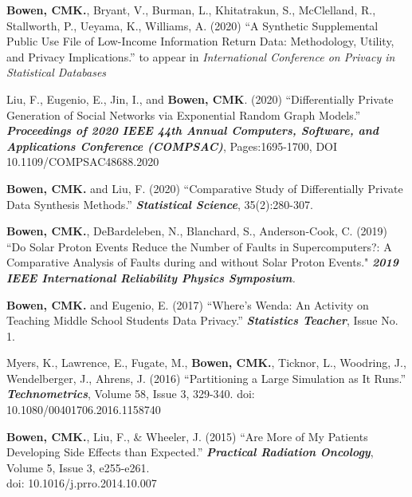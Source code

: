 \documentclass[11pt, letterpaper, roman]{moderncv} %
\begin{document}
\begin{etaremune}[topsep=0pt, itemsep=3pt, partopsep=0pt, parsep=0pt]
    \item \textbf{Bowen, CMK.}, Bryant, V., Burman, L., Khitatrakun, S., McClelland, R., Stallworth, P., Ueyama, K., Williams, A. (2020) ``A Synthetic Supplemental Public Use File of Low-Income Information Return Data: Methodology, Utility, and Privacy Implications.'' to appear in  \textit{International Conference on Privacy in Statistical Databases}
    
    \item Liu, F., Eugenio, E., Jin, I., and \textbf{Bowen, CMK}. (2020) ``Differentially Private Generation of Social Networks via Exponential Random Graph Models.'' \textit{\textbf{Proceedings of 2020 IEEE 44th Annual Computers, Software, and Applications Conference (COMPSAC)}}, Pages:1695-1700, DOI 10.1109/COMPSAC48688.2020

    \item \textbf{Bowen, CMK.} and Liu, F. (2020) ``Comparative Study of Differentially Private Data Synthesis Methods.'' \textbf{\textit{Statistical Science}}, 35(2):280-307.

    \item \textbf{Bowen, CMK.}, DeBardeleben, N., Blanchard, S., Anderson-Cook, C. (2019) ``Do Solar Proton Events Reduce the Number of Faults in Supercomputers?: A Comparative Analysis of Faults during and without Solar Proton Events." \textit{\textbf{2019 IEEE International Reliability Physics Symposium}.}

    \item \textbf{Bowen, CMK.} and Eugenio, E. (2017) ``Where's Wenda:  An Activity on Teaching Middle School Students Data Privacy.'' \textit{\textbf{Statistics Teacher}}, Issue No. 1.
    
    \item Myers, K., Lawrence, E., Fugate, M., \textbf{Bowen, CMK.}, Ticknor, L., Woodring, J., Wendelberger, J., Ahrens, J. (2016) ``Partitioning a Large Simulation as It Runs.'' \textit{\textbf{Technometrics}}, Volume 58, Issue 3, 329-340. 
    doi: 10.1080/00401706.2016.1158740

    \item \textbf{Bowen, CMK.}, Liu, F., \& Wheeler, J. (2015) ``Are More of My Patients Developing Side Effects than Expected.'' \textit{\textbf{Practical Radiation Oncology}}, Volume 5, Issue 3, e255-e261.\\
    doi: 10.1016/j.prro.2014.10.007
    

\end{etaremune}
\end{document}

